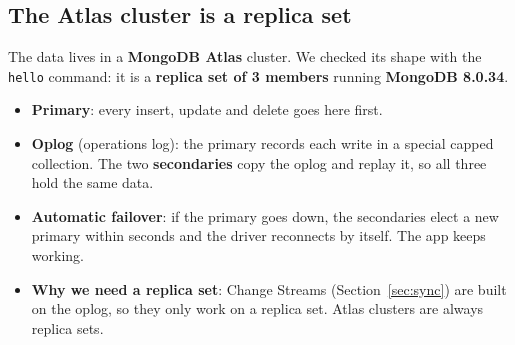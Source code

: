 \documentclass[11pt,a4paper]{article}
\begin{document}
\subsection{The Atlas cluster is a replica set}
The data lives in a \textbf{MongoDB Atlas} cluster. We checked its shape with the \texttt{hello} command:
it is a \textbf{replica set of 3 members} running \textbf{MongoDB 8.0.34}.

\begin{center}
\end{center}

\begin{itemize}[leftmargin=1.4em]
  \item \textbf{Primary}: every insert, update and delete goes here first.
  \item \textbf{Oplog} (operations log): the primary records each write in a special capped collection. The two
        \textbf{secondaries} copy the oplog and replay it, so all three hold the same data.
  \item \textbf{Automatic failover}: if the primary goes down, the secondaries elect a new primary within seconds and the
        driver reconnects by itself. The app keeps working.
  \item \textbf{Why we need a replica set}: Change Streams (Section~\ref{sec:sync}) are built on the oplog, so they only
        work on a replica set. Atlas clusters are always replica sets.
\end{itemize}
\end{document}
